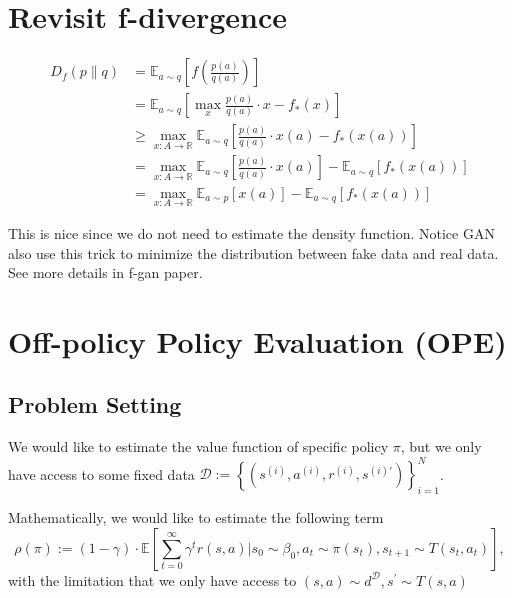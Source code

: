 \documentclass[a4paper]{article}
\theoremstyle{definition}
\begin{document}
\section{Revisit f-divergence}
\begin{equation}
\begin{aligned} D_{f}(p \| q) &=\mathbb{E}_{a \sim q}\left[f\left(\frac{p(a)}{q(a)}\right)\right] \\ &=\mathbb{E}_{a \sim q}\left[\max _{x} \frac{p(a)}{q(a)} \cdot x-f_{*}(x)\right] \\ &\geq \max _{x: A \rightarrow \mathbb{R}} \mathbb{E}_{a \sim q}\left[\frac{p(a)}{q(a)} \cdot x(a)-f_{*}(x(a))\right] \\ &=\max _{x: A \rightarrow \mathbb{R}} \mathbb{E}_{a \sim q}\left[\frac{p(a)}{q(a)} \cdot x(a)\right]-\mathbb{E}_{a \sim q}\left[f_{*}(x(a))\right] \\ &=\max _{x: A \rightarrow \mathbb{R}} \mathbb{E}_{a \sim p}[x(a)]-\mathbb{E}_{a \sim q}\left[f_{*}(x(a))\right] \end{aligned}
\end{equation}

This is nice since we do not need to estimate the density function. Notice GAN also use this trick to minimize the distribution between fake data and real data. See more details in f-gan \cite{ref1} paper.

\section{Off-policy Policy Evaluation (OPE)}
\subsection{Problem Setting}
We would like to estimate the value function of specific policy $\pi$, but we only have access to some fixed data $
\mathcal{D}:=\left\{\left(s^{(i)}, a^{(i)}, r^{(i)}, s^{(i) \prime}\right)\right\}_{i=1}^{N}
$. 

Mathematically, we would like to estimate the following term
\begin{equation}
\rho(\pi):=(1-\gamma) \cdot \mathbb{E}\left[\sum_{t=0}^{\infty} \gamma^{t} r(s, a) | s_{0} \sim \beta_{0}, a_{t} \sim \pi\left(s_{t}\right), s_{t+1} \sim T\left(s_{t}, a_{t}\right)\right],
\end{equation}
with the limitation that we only have access to $
(s, a) \sim d^{\mathcal{D}}, s^{\prime} \sim T(s, a)
$
\end{document}
